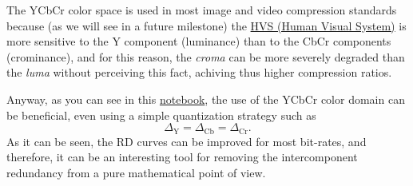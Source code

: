 \begin{comment}
The International Consultative Committee for Radio (CCIR)11 Recommendation 601:
\begin{equation}
\begin{array}
Y ′= 219(+0.299R′ + 0.587G′ + 0.114B′) + 16 \\
CB′= 224(-0.169R′ - 0.331G′ + 0.500B′) + 128 \\
CR′= 224(+0.500R′ - 0.419G′ - 0.081B′) + 128
\end{array}
\end{equation}

0.299*(−0.169) + 0.587*(−0.331) + 0.114*0.500 = -.187828

(-0.169)*0.500 + (-0.331)*(-0.419) + 0.500*(-0.081) = .013689
\end{comment}

The YCbCr color space is used in most image and video compression
standards because (as we will see in a future milestone) the
\href{https://en.wikipedia.org/wiki/Visual_system}{HVS (Human Visual
  System)} is more sensitive to the Y component (luminance) than to
the CbCr components (crominance), and for this reason, the
\emph{croma} can be more severely degraded than the \emph{luma}
without perceiving this fact, achiving thus higher compression ratios.

Anyway, as you can see in this
\href{https://github.com/Sistemas-Multimedia/Sistemas-Multimedia.github.io/blob/master/study_guide/06-color_transform/performance.ipynb}{notebook},
the use of the YCbCr color domain can be beneficial, even using a
simple quantization strategy such as
\begin{equation}
  \Delta_{\text{Y}} = \Delta_{\text{Cb}} = \Delta_{\text{Cr}}.
\end{equation}
As it can be seen, the RD curves can be improved for most bit-rates,
and therefore, it can be an interesting tool for removing the
intercomponent redundancy from a pure mathematical point of view.

